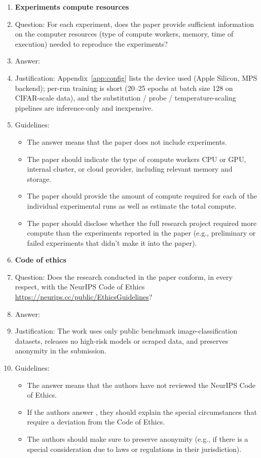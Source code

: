 \documentclass{article}
\begin{document}
\begin{enumerate}
\item {\bf Experiments compute resources}
    \item[] Question: For each experiment, does the paper provide sufficient information on the computer resources (type of compute workers, memory, time of execution) needed to reproduce the experiments?
    \item[] Answer: \answerYes{}
    \item[] Justification: Appendix~\ref{app:config} lists the device used (Apple Silicon, MPS backend); per-run training is short (20--25 epochs at batch size 128 on CIFAR-scale data), and the substitution / probe / temperature-scaling pipelines are inference-only and inexpensive.
    \item[] Guidelines:
    \begin{itemize}
        \item The answer \answerNA{} means that the paper does not include experiments.
        \item The paper should indicate the type of compute workers CPU or GPU, internal cluster, or cloud provider, including relevant memory and storage.
        \item The paper should provide the amount of compute required for each of the individual experimental runs as well as estimate the total compute.
        \item The paper should disclose whether the full research project required more compute than the experiments reported in the paper (e.g., preliminary or failed experiments that didn't make it into the paper).
    \end{itemize}

\item {\bf Code of ethics}
    \item[] Question: Does the research conducted in the paper conform, in every respect, with the NeurIPS Code of Ethics \url{https://neurips.cc/public/EthicsGuidelines}?
    \item[] Answer: \answerYes{}
    \item[] Justification: The work uses only public benchmark image-classification datasets, releases no high-risk models or scraped data, and preserves anonymity in the submission.
    \item[] Guidelines:
    \begin{itemize}
        \item The answer \answerNA{} means that the authors have not reviewed the NeurIPS Code of Ethics.
        \item If the authors answer \answerNo, they should explain the special circumstances that require a deviation from the Code of Ethics.
        \item The authors should make sure to preserve anonymity (e.g., if there is a special consideration due to laws or regulations in their jurisdiction).
    \end{itemize}



\end{enumerate}
\end{document}

